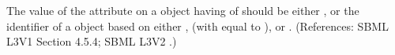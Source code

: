 The value of the attribute  on a \Compartment object having
 of  should be either 
, or the identifier of a \UnitDefinition object based on either
,  (with  equal to ), or
.  (References: SBML L3V1 Section 4.5.4; SBML L3V2
.)
